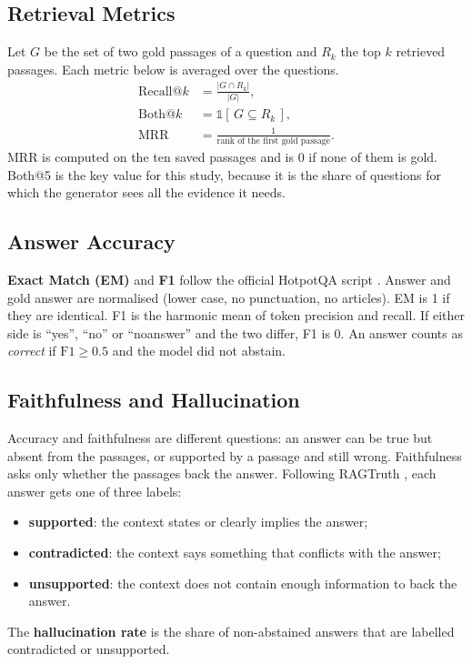 \subsection{Retrieval Metrics}
Let $G$ be the set of two gold passages of a question and $R_k$ the top $k$ retrieved passages.
Each metric below is averaged over the questions.
\begin{align}
\text{Recall@}k &= \frac{|G \cap R_k|}{|G|}, \label{eq:recall}\\
\text{Both@}k &= \mathbb{1}\left[\,G \subseteq R_k\,\right], \label{eq:both}\\
\text{MRR} &= \frac{1}{\text{rank of the first gold passage}}. \label{eq:mrr}
\end{align}
MRR is computed on the ten saved passages and is 0 if none of them is gold. Both@5 is the key value
for this study, because it is the share of questions for which the generator sees all the evidence
it needs.

\subsection{Answer Accuracy}
\textbf{Exact Match (EM)} and \textbf{F1} follow the official HotpotQA script
\cite{yang2018hotpotqa}. Answer and gold answer are normalised (lower case, no punctuation, no
articles). EM is 1 if they are identical. F1 is the harmonic mean of token precision and recall. If
either side is ``yes'', ``no'' or ``noanswer'' and the two differ, F1 is 0. An answer counts as
\emph{correct} if $\text{F1} \geq 0.5$ and the model did not abstain.

\subsection{Faithfulness and Hallucination}
Accuracy and faithfulness are different questions: an answer can be true but absent from the
passages, or supported by a passage and still wrong. Faithfulness asks only whether the passages
back the answer. Following RAGTruth \cite{niu2024ragtruth}, each answer gets one of three labels:
\begin{itemize}
\item \textbf{supported}: the context states or clearly implies the answer;
\item \textbf{contradicted}: the context says something that conflicts with the answer;
\item \textbf{unsupported}: the context does not contain enough information to back the answer.
\end{itemize}
The \textbf{hallucination rate} is the share of non-abstained answers that are labelled contradicted
or unsupported.

